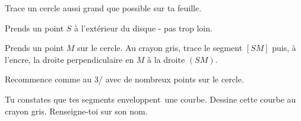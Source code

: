 \begin{myenumerate}
  \item Trace un cercle aussi grand que possible sur ta feuille.
  \item Prends un point $S$ à l'extérieur du disque - pas trop loin.
  \item Prends un point $M$ sur le cercle. Au crayon gris, trace le segment $[SM]$ puis, à l'encre, la droite perpendiculaire en $M$ à la droite $(SM)$.
  \item Recommence comme au 3/ avec de nombreux points sur le cercle.
  \item Tu constates que tes segments \og enveloppent\fg\ une courbe. Dessine cette courbe au crayon gris. Renseigne-toi sur son nom.
\end{myenumerate}